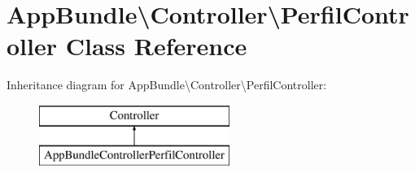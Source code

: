 \hypertarget{class_app_bundle_1_1_controller_1_1_perfil_controller}{}\section{App\+Bundle\textbackslash{}Controller\textbackslash{}Perfil\+Controller Class Reference}
\label{class_app_bundle_1_1_controller_1_1_perfil_controller}
Inheritance diagram for App\+Bundle\textbackslash{}Controller\textbackslash{}Perfil\+Controller\+:\begin{figure}[H]
\begin{center}
\leavevmode
\includegraphics[height=2.000000cm]{class_app_bundle_1_1_controller_1_1_perfil_controller}
\end{center}
\end{figure}
